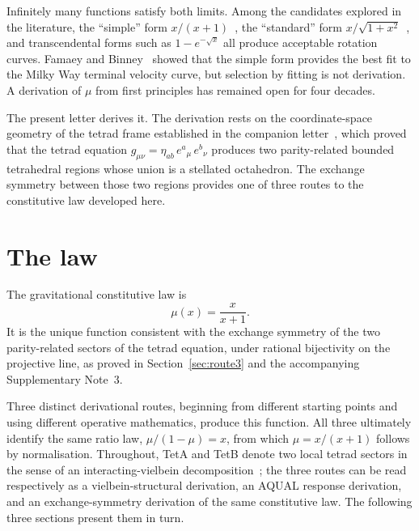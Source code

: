 \documentclass[twocolumn]{iopjournal}
\begin{document}
Infinitely many functions satisfy both limits. Among the
candidates explored in the literature, the ``simple'' form
$x/(x+1)$~\cite{FamaeyBinney2005}, the ``standard'' form
$x/\sqrt{1+x^2}$~\cite{Milgrom1983}, and transcendental forms
such as $1 - e^{-\sqrt{x}}$ all produce acceptable rotation
curves. Famaey and Binney~\cite{FamaeyBinney2005} showed that
the simple form provides the best fit to the Milky Way terminal
velocity curve, but selection by fitting is not derivation. A
derivation of $\mu$ from first principles has remained open for
four decades.

The present letter derives it. The derivation rests on the
coordinate-space geometry of the tetrad frame established in
the companion letter~\cite{Nelson2026a}, which proved that the
tetrad equation $g_{\mu\nu} = \eta_{ab}\,e^a{}_\mu\,e^b{}_\nu$
produces two parity-related bounded tetrahedral regions whose
union is a stellated octahedron. The exchange symmetry between
those two regions provides one of three routes to the
constitutive law developed here.


\section{The law}

The gravitational constitutive law is
\begin{equation}
  \boxed{\mu(x) = \frac{x}{x + 1}.}
  \label{eq:law}
\end{equation}
It is the unique function consistent with the exchange symmetry
of the two parity-related sectors of the tetrad equation, under
rational bijectivity on the projective line, as proved in
Section~\ref{sec:route3} and the accompanying
Supplementary Note~3.

Three distinct derivational routes, beginning from different
starting points and using different operative mathematics,
produce this function. All three ultimately identify the same
ratio law, $\mu/(1-\mu) = x$, from which $\mu = x/(x+1)$
follows by normalisation. Throughout, TetA and TetB denote
two local tetrad sectors in the sense of an
interacting-vielbein decomposition~\cite{HR2012a}; the three
routes can be read respectively as a vielbein-structural
derivation, an AQUAL response derivation, and an
exchange-symmetry derivation of the same constitutive law.
The following three sections present them in turn.

\end{document}
